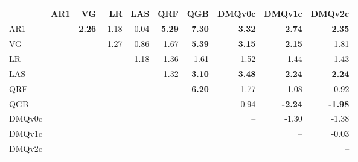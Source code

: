 \begin{tabular}{lrrrrrrrrr}
\toprule
 & AR1 & VG & LR & LAS & QRF & QGB & DMQv0c & DMQv1c & DMQv2c \\
\midrule
AR1 & -- & \textbf{2.26} & -1.18 & -0.04 & \textbf{5.29} & \textbf{7.30} & \textbf{3.32} & \textbf{2.74} & \textbf{2.35} \\
VG &  & -- & -1.27 & -0.86 & 1.67 & \textbf{5.39} & \textbf{3.15} & \textbf{2.15} & 1.81 \\
LR &  &  & -- & 1.18 & 1.36 & 1.61 & 1.52 & 1.44 & 1.43 \\
LAS &  &  &  & -- & 1.32 & \textbf{3.10} & \textbf{3.48} & \textbf{2.24} & \textbf{2.24} \\
QRF &  &  &  &  & -- & \textbf{6.20} & 1.77 & 1.08 & 0.92 \\
QGB &  &  &  &  &  & -- & -0.94 & \textbf{-2.24} & \textbf{-1.98} \\
DMQv0c &  &  &  &  &  &  & -- & -1.30 & -1.38 \\
DMQv1c &  &  &  &  &  &  &  & -- & -0.03 \\
DMQv2c &  &  &  &  &  &  &  &  & -- \\
\bottomrule
\end{tabular}
